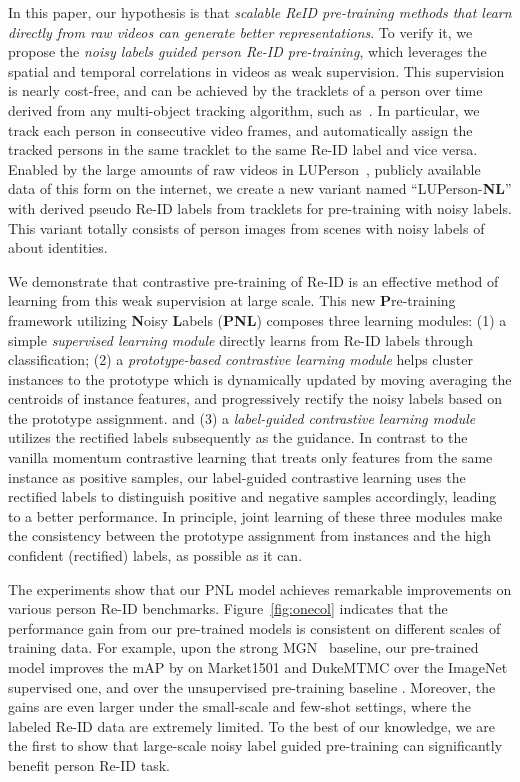 \documentclass[10pt,twocolumn,letterpaper]{article}
\begin{document}
In this paper, our hypothesis is that \emph{scalable ReID pre-training methods that learn directly from raw videos can generate better representations}. To verify it, we propose the \emph{noisy labels guided person Re-ID pre-training}, which leverages the spatial and temporal correlations in videos as weak supervision. This supervision is nearly cost-free, and can be achieved by the tracklets of a person over time derived from any multi-object tracking algorithm, such as~\cite{zhang2020fairmot}. In particular, we track each person in consecutive video frames, and automatically assign the tracked persons in the same tracklet to the same Re-ID label and vice versa. Enabled by the large amounts of raw videos in LUPerson~\cite{fu2020unsupervised}, publicly available data of this form on the internet, we create a new variant named {``LUPerson-{\bf{NL}}''} with derived pseudo Re-ID labels from tracklets for pre-training with noisy labels. This variant totally consists of  person images from  scenes with noisy labels of about  identities.

We demonstrate that contrastive pre-training of Re-ID is an effective method of learning from this weak supervision at large scale. This new \textbf{P}re-training framework utilizing \textbf{N}oisy \textbf{L}abels (\textbf{PNL}) composes three learning modules: (1) a simple \emph{supervised learning module} directly learns from Re-ID labels through classification; (2) a \emph{prototype-based contrastive learning module} helps cluster instances to the prototype which is dynamically updated by moving averaging the centroids of instance features, and progressively rectify the noisy labels based on the prototype assignment. and (3) a \emph{label-guided contrastive learning module} utilizes the rectified labels subsequently as the guidance. In contrast to the vanilla momentum contrastive learning \cite{he2020momentum,chen2020mocov2,fu2020unsupervised} that treats only features from the same instance as positive samples, our label-guided contrastive learning uses the rectified labels to distinguish positive and negative samples accordingly, leading to a better performance. In principle, joint learning of these three modules make the consistency between the prototype assignment from instances and the high confident (rectified) labels, as possible as it can.

The experiments show that our PNL model achieves remarkable improvements on various person Re-ID benchmarks. Figure~\ref{fig:onecol} indicates that the performance gain from our pre-trained models is consistent on different scales of training data. For example, upon the strong MGN~\cite{wang2018learning} baseline, our pre-trained model improves the mAP by  on Market1501 and DukeMTMC over the ImageNet supervised one, and  over the unsupervised pre-training baseline \cite{fu2020unsupervised}. Moreover, the gains are even larger under the small-scale and few-shot settings, where the labeled Re-ID data are extremely limited. To the best of our knowledge, we are the first to show that large-scale noisy label guided pre-training can significantly benefit person Re-ID task.
\end{document}

